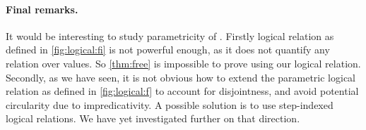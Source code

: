 \paragraph{Final remarks.}

It would be interesting to study parametricity of \fnamee. Firstly logical
relation as defined in \cref{fig:logical:fi} is not powerful enough, as it does
not quantify any relation over values. So \cref{thm:free} is impossible to
prove using our logical relation. Secondly, as we have seen, it is not obvious
how to extend the parametric logical relation as defined in \cref{fig:logical:f}
to account for disjointness, and avoid potential circularity due to
impredicativity. A possible solution is to use step-indexed logical relations.
We have yet investigated further on that direction.
